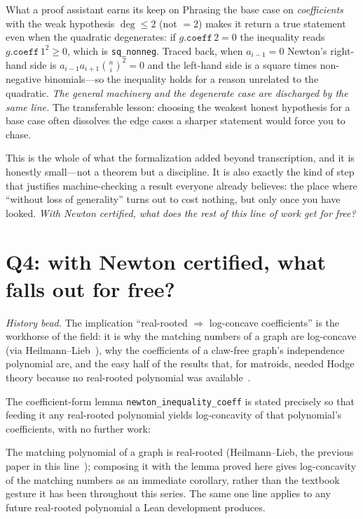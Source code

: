 \documentclass[11pt]{article}
\newcommand{\lean}[1]{\texttt{#1}}
\newcommand{\keyeq}[1]{\begin{center}\keybox{$\displaystyle #1$}\end{center}}
\begin{document}
\begin{recipebox}{What a proof assistant earns its keep on}
Phrasing the base case on \emph{coefficients} with the weak hypothesis $\deg\le2$ (not $=2$) makes
it return a true statement even when the quadratic degenerates: if $g.\mathtt{coeff}\,2=0$ the
inequality reads $g.\mathtt{coeff}\,1^2\ge0$, which is \lean{sq\_nonneg}. Traced back, when
$a_{i-1}=0$ Newton's right-hand side is $a_{i-1}a_{i+1}\binom{n}{i}^2=0$ and the left-hand side is a
square times non-negative binomials---so the inequality holds for a reason unrelated to the
quadratic. \emph{The general machinery and the degenerate case are discharged by the same line.}
The transferable lesson: choosing the weakest honest hypothesis for a base case often dissolves the
edge cases a sharper statement would force you to chase.
\end{recipebox}

This is the whole of what the formalization added beyond transcription, and it is honestly
small---not a theorem but a discipline. It is also exactly the kind of step that justifies
machine-checking a result everyone already believes: the place where ``without loss of generality''
turns out to cost nothing, but only once you have looked. \emph{With Newton certified, what does
the rest of this line of work get for free?}

\section{Q4: with Newton certified, what falls out for free?}\label{sec:corollaries}

\emph{History bead.} The implication ``real-rooted $\Rightarrow$ log-concave coefficients'' is the
workhorse of the field: it is why the matching numbers of a graph are log-concave (via
Heilmann--Lieb~\cite{PartII}), why the coefficients of a claw-free graph's independence polynomial
are, and the easy half of the results that, for matroids, needed Hodge theory because no
real-rooted polynomial was available~\cite{AHK2018}.

The coefficient-form lemma \lean{newton\_inequality\_coeff} is stated precisely so that feeding it
any real-rooted polynomial yields log-concavity of that polynomial's coefficients, with no further
work:
\keyeq{\text{real-rooted}\;\Longrightarrow\;\text{log-concave coefficients}.}
The matching polynomial of a graph is real-rooted (Heilmann--Lieb, the previous paper in this
line~\cite{PartII}); composing it with the lemma proved here gives log-concavity of the matching
numbers as an immediate corollary, rather than the textbook gesture it has been throughout this
series. The same one line applies to any future real-rooted polynomial a Lean development produces.
\end{document}
